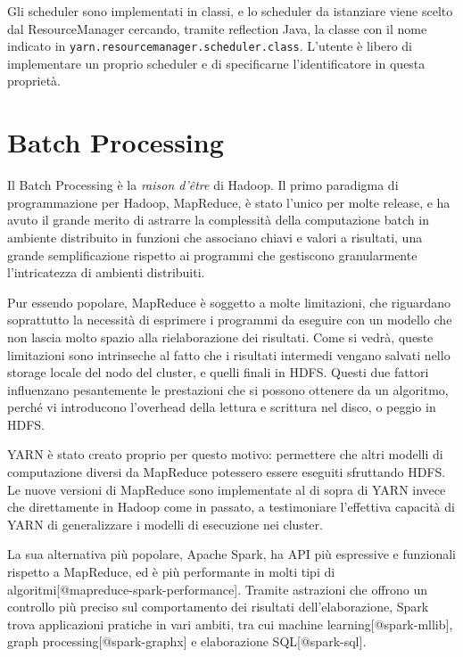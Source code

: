 \documentclass[italian,a4paper, twoside, 12pt]{report}
\begin{document}
Gli scheduler sono implementati in classi, e lo scheduler da istanziare
viene scelto dal ResourceManager cercando, tramite reflection Java, la
classe con il nome indicato in
\lstinline!yarn.resourcemanager.scheduler.class!. L'utente è libero di
implementare un proprio scheduler e di specificarne l'identificatore in
questa proprietà.

\chapter{Batch Processing}\label{batch-processing}

Il Batch Processing è la \emph{raison d'être} di Hadoop. Il primo
paradigma di programmazione per Hadoop, MapReduce, è stato l'unico per
molte release, e ha avuto il grande merito di astrarre la complessità
della computazione batch in ambiente distribuito in funzioni che
associano chiavi e valori a risultati, una grande semplificazione
rispetto ai programmi che gestiscono granularmente l'intricatezza di
ambienti distribuiti.

Pur essendo popolare, MapReduce è soggetto a molte limitazioni, che
riguardano soprattutto la necessità di esprimere i programmi da eseguire
con un modello che non lascia molto spazio alla rielaborazione dei
risultati. Come si vedrà, queste limitazioni sono intrinseche al fatto
che i risultati intermedi vengano salvati nello storage locale del nodo
del cluster, e quelli finali in HDFS. Questi due fattori influenzano
pesantemente le prestazioni che si possono ottenere da un algoritmo,
perché vi introducono l'overhead della lettura e scrittura nel disco, o
peggio in HDFS.

YARN è stato creato proprio per questo motivo: permettere che altri
modelli di computazione diversi da MapReduce potessero essere eseguiti
sfruttando HDFS. Le nuove versioni di MapReduce sono implementate al di
sopra di YARN invece che direttamente in Hadoop come in passato, a
testimoniare l'effettiva capacità di YARN di generalizzare i modelli di
esecuzione nei cluster.

La sua alternativa più popolare, Apache Spark, ha API più espressive e
funzionali rispetto a MapReduce, ed è più performante in molti tipi di
algoritmi{[}@mapreduce-spark-performance{]}. Tramite astrazioni che
offrono un controllo più preciso sul comportamento dei risultati
dell'elaborazione, Spark trova applicazioni pratiche in vari ambiti, tra
cui machine learning{[}@spark-mllib{]}, graph
processing{[}@spark-graphx{]} e elaborazione SQL{[}@spark-sql{]}.
\end{document}
